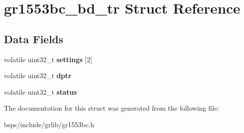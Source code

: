 \hypertarget{structgr1553bc__bd__tr}{}\section{gr1553bc\+\_\+bd\+\_\+tr Struct Reference}
\label{structgr1553bc__bd__tr}
\subsection*{Data Fields}
\begin{DoxyCompactItemize}
\item 
\mbox{\label{structgr1553bc__bd__tr_aeb3150871c2071a8f889c5ea9bd9ce03}} 
volatile uint32\+\_\+t {\bfseries settings} \mbox{[}2\mbox{]}
\item 
\mbox{\label{structgr1553bc__bd__tr_a6796a845fe38b9d8509dd816d24f3b9f}} 
volatile uint32\+\_\+t {\bfseries dptr}
\item 
\mbox{\label{structgr1553bc__bd__tr_a79ca5e79394eac2ca5c9e37bb2c52b9d}} 
volatile uint32\+\_\+t {\bfseries status}
\end{DoxyCompactItemize}


The documentation for this struct was generated from the following file\+:\begin{DoxyCompactItemize}
\item 
bsps/include/grlib/gr1553bc.\+h\end{DoxyCompactItemize}

